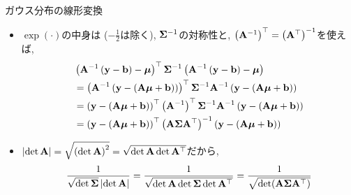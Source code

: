 \documentclass[dvipdfmx,notheorems,t]{beamer}
\begin{document}
\begin{frame}{ガウス分布の線形変換}
\begin{itemize}
  \item $\exp(\cdot)$の中身は ($-\frac{1}{2}$は除く), $\vb{\Sigma}^{-1}$の対称性と,
  $\left( \vb{A}^{-1} \right)^\top = \left( \vb{A}^\top \right)^{-1}$を使えば,
  \begin{align*}
    & \left( \vb{A}^{-1} \left( \vb{y} - \vb{b} \right) - \vb*{\mu} \right)^\top
      \vb{\Sigma}^{-1} \left( \vb{A}^{-1} \left( \vb{y} - \vb{b} \right) - \vb*{\mu} \right) \\
    &= \left( \vb{A}^{-1} \left( \vb{y} - \left( \vb{A} \vb*{\mu} + \vb{b} \right) \right) \right)^\top
      \vb{\Sigma}^{-1} \vb{A}^{-1} \left( \vb{y} - \left( \vb{A} \vb*{\mu} + \vb{b} \right) \right) \\
    &= \left( \vb{y} - \left( \vb{A} \vb*{\mu} + \vb{b} \right) \right)^\top
      \left( \vb{A}^{-1} \right)^\top \vb{\Sigma}^{-1} \vb{A}^{-1}
      \left( \vb{y} - \left( \vb{A} \vb*{\mu} + \vb{b} \right) \right) \\
    &= \left( \vb{y} - \left( \vb{A} \vb*{\mu} + \vb{b} \right) \right)^\top
      \left( \vb{A} \vb{\Sigma} \vb{A}^\top \right)^{-1}
      \left( \vb{y} - \left( \vb{A} \vb*{\mu} + \vb{b} \right) \right)
  \end{align*}
  \item $\left| \det \vb{A} \right| = \sqrt{\left( \det \vb{A} \right)^2}
    = \sqrt{\det \vb{A} \det \vb{A}^\top}$だから,
  \begin{align*}
    \frac{1}{\sqrt{\det \vb{\Sigma}} \left| \det \vb{A} \right|}
    = \frac{1}{\sqrt{\det \vb{A} \det \vb{\Sigma} \det \vb{A}^\top}}
    = \frac{1}{\sqrt{\det(\vb{A} \vb{\Sigma} \vb{A}^\top)}}
  \end{align*}
\end{itemize}
\end{frame}
\end{document}
